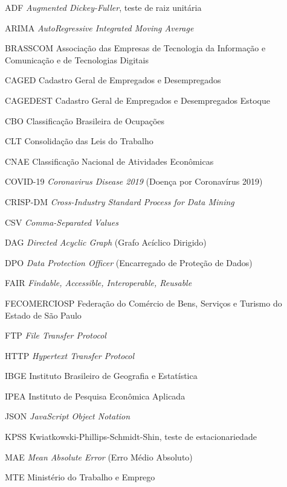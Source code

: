 
\begin{siglas}
    \item[ADF] \textit{Augmented Dickey-Fuller}, teste de raiz unitária
    \item[ARIMA] \textit{AutoRegressive Integrated Moving Average}
    \item[BRASSCOM] Associação das Empresas de Tecnologia da Informação e Comunicação e de Tecnologias Digitais
    \item[CAGED] Cadastro Geral de Empregados e Desempregados
    \item[CAGEDEST] Cadastro Geral de Empregados e Desempregados Estoque
    \item[CBO] Classificação Brasileira de Ocupações
    \item[CLT] Consolidação das Leis do Trabalho
    \item[CNAE] Classificação Nacional de Atividades Econômicas
    \item[COVID-19] \textit{Coronavirus Disease 2019} (Doença por Coronavírus 2019)
    \item[CRISP-DM] \textit{Cross-Industry Standard Process for Data Mining}
    \item[CSV] \textit{Comma-Separated Values}
    \item[DAG] \textit{Directed Acyclic Graph} (Grafo Acíclico Dirigido)
    \item[DPO] \textit{Data Protection Officer} (Encarregado de Proteção de Dados)
    \item[FAIR] \textit{Findable, Accessible, Interoperable, Reusable}
    \item[FECOMERCIOSP] Federação do Comércio de Bens, Serviços e Turismo do Estado de São Paulo
    \item[FTP] \textit{File Transfer Protocol}
    \item[HTTP] \textit{Hypertext Transfer Protocol}
    \item[IBGE] Instituto Brasileiro de Geografia e Estatística
    \item[IPEA] Instituto de Pesquisa Econômica Aplicada
    \item[JSON] \textit{JavaScript Object Notation}
    \item[KPSS] Kwiatkowski-Phillips-Schmidt-Shin, teste de estacionariedade
    \item[MAE] \textit{Mean Absolute Error} (Erro Médio Absoluto)
    \item[MTE] Ministério do Trabalho e Emprego

\end{siglas}
